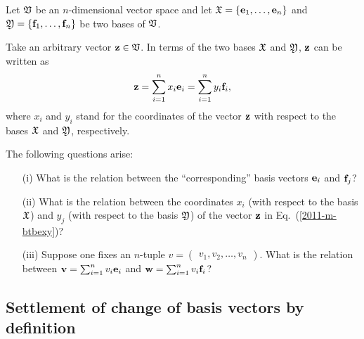 Let ${\frak V}$ be an $n$-dimensional vector space and let
${\frak X}
=
\{
{\bf e}_1,
\ldots ,
{\bf e}_n
\}$
and
${\frak Y}
=  \{
{\bf f}_1,
\ldots ,
{\bf f}_n
\}$ be two bases of ${\frak V}$.

Take an arbitrary vector ${\bf z}\in {\frak V}$.
In terms of the two bases
${\frak X}$ and
${\frak Y}$,
${\bf z}$ can be written as
\begin{equation}
{\bf z}=
\sum_{i=1}^n x_i{\bf e}_i
=
\sum_{i=1}^n  y_i{\bf f}_i,
\label{2011-m-btbexy}
\end{equation}
where $x_i$ and $y_i$ stand for the coordinates of the vector  ${\bf z}$
with respect to the bases ${\frak X}$ and
${\frak Y}$,
respectively.

The following questions arise:
\begin{itemize}
\item[(i)]
What is the relation between the ``corresponding'' basis vectors ${\bf e}_i$ and ${\bf f}_j$?
\item[(ii)]
What is the relation between the coordinates $x_i$ (with respect to the basis  ${\frak X}$) and $y_j$ (with respect to the basis  ${\frak Y}$)  of the vector ${\bf z}$ in Eq.~(\ref{2011-m-btbexy})?
\item[(iii)]
Suppose one fixes
an $n$-tuple $v = \begin{pmatrix} v_1, v_2, \ldots , v_n \end{pmatrix}$.
What is the relation between
${\bf v} =
\sum_{i=1}^n v_i {\bf e}_i
$
and
${\bf w}=
\sum_{i=1}^n v_i {\bf f}_i
$?
\end{itemize}

\subsection{Settlement of change of basis vectors by definition}

